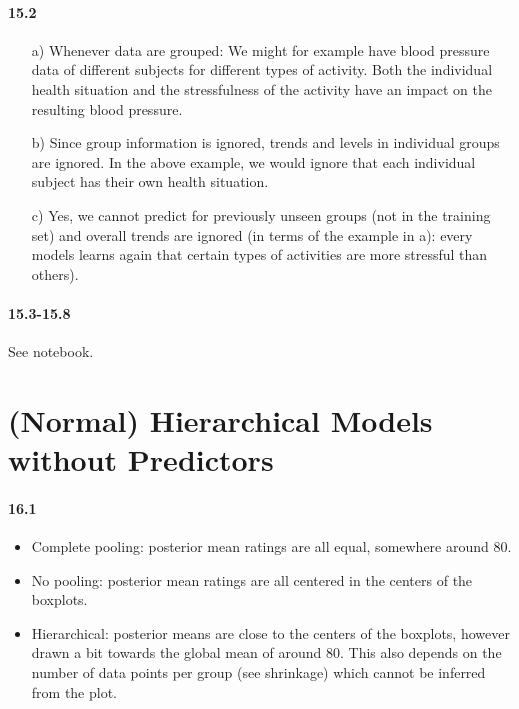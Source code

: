 \documentclass[fontsize=11pt,DIV=18,parskip=half]{scrartcl}
\begin{document}
\paragraph{15.2}
\begin{itemize}
\item[a)] Whenever data are grouped: We might for example have blood pressure data of different subjects for different types of activity. Both the individual health situation and the stressfulness of the activity have an impact on the resulting blood pressure.
\item[b)] Since group information is ignored, trends and levels in individual groups are ignored. In the above example, we would ignore that each individual subject has their own health situation.
\item[c)] Yes, we cannot predict for previously unseen groups (not in the training set) and overall trends are ignored (in terms of the example in a): every models learns again that certain types of activities are more stressful than others).
\end{itemize}

\paragraph{15.3-15.8} See notebook.

\section{(Normal) Hierarchical Models without Predictors}

\paragraph{16.1} 
\begin{itemize}
\item Complete pooling: posterior mean ratings are all equal, somewhere around 80.
\item No pooling: posterior mean ratings are all centered in the centers of the boxplots.
\item Hierarchical: posterior means are close to the centers of the boxplots, however drawn a bit towards the global mean of around 80. This also depends on the number of data points per group (see shrinkage) which cannot be inferred from the plot.
\end{itemize}
\end{document}
